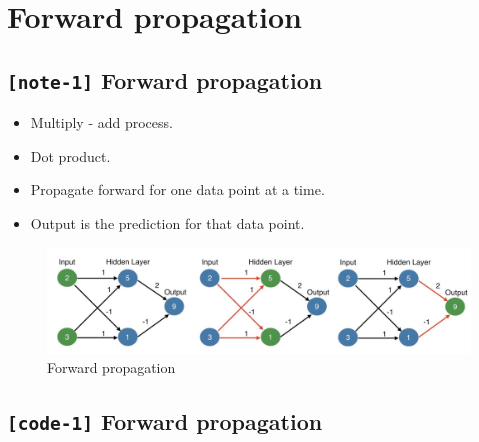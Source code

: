 \documentclass[11pt, twoside]{article}
\begin{document}
    \hypertarget{forward-propagation}{%
\section{Forward propagation}\label{forward-propagation}}

    \hypertarget{note-1-forward-propagation}{%
\subsection{\texorpdfstring{\texttt{{[}note-1{]}} Forward
propagation}{{[}note-1{]} Forward propagation}}\label{note-1-forward-propagation}}

\begin{itemize}
\item
  Multiply - add process.
\item
  Dot product.
\item
  Propagate forward for one data point at a time.
\item
  Output is the prediction for that data point.
\end{itemize}

\begin{figure}
\centering
\includegraphics{../Figures/4. Forward propagation.jpg}
\caption{Forward propagation}
\end{figure}

    \hypertarget{code-1-forward-propagation}{%
\subsection{\texorpdfstring{\texttt{{[}code-1{]}} Forward
propagation}{{[}code-1{]} Forward propagation}}\label{code-1-forward-propagation}}
\end{document}
